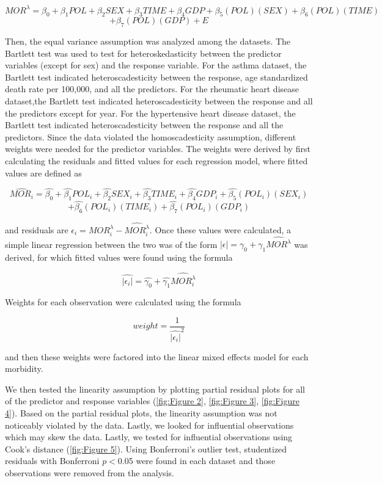 \documentclass[12pt, letterpaper, twoside]{article}\usepackage[]{graphicx}\usepackage[]{xcolor}
\begin{document}
\[
  MOR^{\lambda} = \beta_{0} + \beta_{1}POL + \beta_{2}SEX + \beta_{3}TIME +\beta_{4}GDP
  + \beta_{5}(POL)(SEX) + \beta_{6}(POL)(TIME)
\]
\[
 + \beta_{7}(POL)(GDP) + E
\]

\par Then, the equal variance assumption was analyzed among the datasets. The
Bartlett test was used to test for heteroskedasticity between the predictor
variables (except for sex) and the response variable. For the asthma dataset,
the Bartlett test indicated heteroscadesticity between the response, age
standardized death rate per 100,000, and all the predictors. For the rheumatic
heart disease dataset,the Bartlett test indicated heteroscadesticity between the
response and all the predictors except for year. For the hypertensive heart
disease dataset, the Bartlett test indicated heteroscadesticity between the
response and all the predictors. Since the data violated the homoscadesticity
assumption, different weights were needed for the predictor variables. The weights
were derived by first calculating the residuals and fitted values for each regression
model, where fitted values are defined as

\[
  \hat{MOR_i} = \hat{\beta_{0}} + \hat{\beta_{1}}POL_i + \hat{\beta_{2}}SEX_i +
  \hat{\beta_{3}}TIME_i +\hat{\beta_{4}}GDP_i + \hat{\beta_{5}}(POL_i)(SEX_i)
\]
\[
+ \hat{\beta_{6}}(POL_i)(TIME_i) + \hat{\beta_{7}}(POL_i)(GDP_i)
\]

and residuals are \begin{math}\epsilon_i = MOR_i^{\lambda}-\hat{MOR_i^{\lambda}}
\end{math}. Once these values were calculated, a simple linear regression between
the two was of the form \begin{math}|\epsilon| = \gamma_0 + \gamma_1\hat{MOR^
{\lambda}}\end{math} was derived, for which fitted values were found using the
formula

\[
\hat{|\epsilon_i|} = \hat{\gamma_0} + \hat{\gamma_1}\hat{MOR_i^
{\lambda}}
\]

Weights for each observation were calculated using the formula

\[
weight = \frac{1}{\hat{|\epsilon_i|}^2}
\]

and then these weights were factored into the linear mixed effects model for
each morbidity.
\par We then tested the linearity assumption by plotting partial
residual plots for all of the predictor and response variables
(\autoref{fig:Figure 2}, \autoref{fig:Figure 3}, \autoref{fig:Figure 4}). Based
on the partial residual plots, the linearity assumption was not noticeably
violated by the data. Lastly, we looked for influential observations which may
skew the data. Lastly, we tested for influential observations using Cook's
distance (\autoref{fig:Figure 5}). Using Bonferroni's outlier test, studentized
residuals with Bonferroni \begin{math}p < \end{math}0.05 were found in each
dataset and those observations were removed from the analysis.
\end{document}
